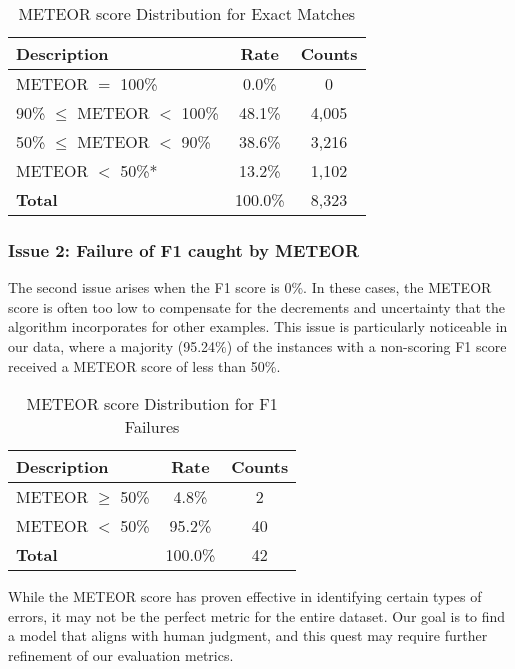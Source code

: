 \documentclass{article}
\begin{document}
\begin{table}[H]
  \centering
  \begin{tabular}{lcc}
  \toprule
  \textbf{Description} & \textbf{Rate} & \textbf{Counts} \\
  \midrule
  METEOR $=$ 100\% & 0.0\% & 0 \\
  90\% $\leq$ METEOR $<$ 100\% & 48.1\% & 4,005 \\
  50\% $\leq$ METEOR $<$ 90\% & 38.6\% & 3,216 \\
  METEOR $<$ 50\%*\footnotemark[1] & 13.2\% & 1,102 \\
  \midrule
  \textbf{Total} & 100.0\% & 8,323 \\
  \bottomrule
  \end{tabular}
  \caption{METEOR score Distribution for Exact Matches}
  \label{tab:METEOR_issue1}
\end{table}


\subsubsection*{Issue 2: Failure of F1 caught by METEOR}

The second issue arises when the F1 score is 0\%. In these cases, the
METEOR score is often too low to compensate for the decrements and
uncertainty that the algorithm incorporates for other examples. This
issue is particularly noticeable in our data, where a majority
(95.24\%) of the instances with a non-scoring F1 score received a
METEOR score of less than 50\%.

\begin{table}[ht]
  \centering
  \begin{tabular}{lcc}
  \toprule
  \textbf{Description} & \textbf{Rate} & \textbf{Counts} \\
  \midrule
  METEOR $\geq$ 50\% & 4.8\% & 2 \\
  METEOR $<$ 50\% & 95.2\% & 40 \\
  \midrule
  \textbf{Total} & 100.0\% & 42 \\
  \bottomrule
  \end{tabular}
  \caption{METEOR score Distribution for F1 Failures}
  \label{tab:METEOR_issue2}
\end{table}

While the METEOR score has proven effective in identifying certain types
of errors, it may not be the perfect metric for the entire dataset.
Our goal is to find a model that aligns with human judgment,
and this quest may require further refinement of our evaluation metrics.
\end{document}
